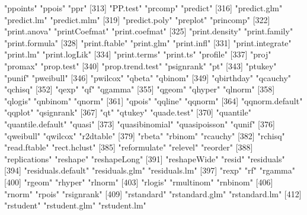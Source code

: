 \begin{Schunk}
\begin{Soutput}
[310] "ppoints"              "ppois"                "ppr"                 
[313] "PP.test"              "prcomp"               "predict"             
[316] "predict.glm"          "predict.lm"           "predict.mlm"         
[319] "predict.poly"         "preplot"              "princomp"            
[322] "print.anova"          "printCoefmat"         "print.coefmat"       
[325] "print.density"        "print.family"         "print.formula"       
[328] "print.ftable"         "print.glm"            "print.infl"          
[331] "print.integrate"      "print.lm"             "print.logLik"        
[334] "print.terms"          "print.ts"             "profile"             
[337] "proj"                 "promax"               "prop.test"           
[340] "prop.trend.test"      "psignrank"            "pt"                  
[343] "ptukey"               "punif"                "pweibull"            
[346] "pwilcox"              "qbeta"                "qbinom"              
[349] "qbirthday"            "qcauchy"              "qchisq"              
[352] "qexp"                 "qf"                   "qgamma"              
[355] "qgeom"                "qhyper"               "qlnorm"              
[358] "qlogis"               "qnbinom"              "qnorm"               
[361] "qpois"                "qqline"               "qqnorm"              
[364] "qqnorm.default"       "qqplot"               "qsignrank"           
[367] "qt"                   "qtukey"               "quade.test"          
[370] "quantile"             "quantile.default"     "quasi"               
[373] "quasibinomial"        "quasipoisson"         "qunif"               
[376] "qweibull"             "qwilcox"              "r2dtable"            
[379] "rbeta"                "rbinom"               "rcauchy"             
[382] "rchisq"               "read.ftable"          "rect.hclust"         
[385] "reformulate"          "relevel"              "reorder"             
[388] "replications"         "reshape"              "reshapeLong"         
[391] "reshapeWide"          "resid"                "residuals"           
[394] "residuals.default"    "residuals.glm"        "residuals.lm"        
[397] "rexp"                 "rf"                   "rgamma"              
[400] "rgeom"                "rhyper"               "rlnorm"              
[403] "rlogis"               "rmultinom"            "rnbinom"             
[406] "rnorm"                "rpois"                "rsignrank"           
[409] "rstandard"            "rstandard.glm"        "rstandard.lm"        
[412] "rstudent"             "rstudent.glm"         "rstudent.lm"         

\end{Soutput}
\end{Schunk}

